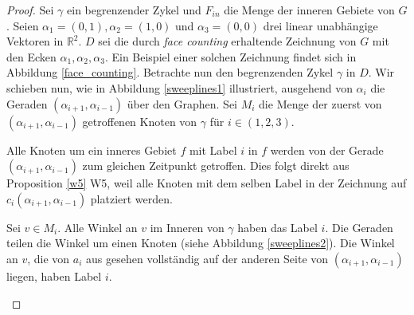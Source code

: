 \begin{proof}
Sei $\gamma$ ein begrenzender Zykel und $F_{in}$ die Menge der inneren Gebiete von $G$. Seien $\alpha_1=(0,1),\alpha_2=(1,0)$ und $\alpha_3=(0,0)$ drei linear unabhängige Vektoren in $\mathbb{R}^2$. $D$ sei die durch \textit{face counting} erhaltende Zeichnung von $G$ mit den Ecken $\alpha_1,\alpha_2,\alpha_3$. Ein Beispiel einer solchen Zeichnung findet sich in Abbildung \ref{face_counting}. Betrachte nun den begrenzenden Zykel $\gamma$ in $D$. Wir schieben nun, wie in Abbildung \ref{sweeplines1} illustriert, ausgehend von $\alpha_i$ die Geraden $(\alpha_{i+1},\alpha_{i-1})$ über den Graphen. Sei $M_i$ die Menge der zuerst von $(\alpha_{i+1},\alpha_{i-1})$ getroffenen Knoten von $\gamma$ für $i \in (1,2,3)$.

\begin{observation}\label{obs1}
Alle Knoten um ein inneres Gebiet $f$ mit Label $i$ in $f$ werden von der Gerade $(\alpha_{i+1},\alpha_{i-1})$ zum gleichen Zeitpunkt getroffen. Dies folgt direkt aus Proposition \ref{w5} W5, weil alle Knoten mit dem selben Label in der Zeichnung auf $c_i(\alpha_{i+1},\alpha_{i-1})$ platziert werden.
\end{observation}

\begin{observation}\label{obs2}
Sei $v \in M_i$. Alle Winkel an $v$ im Inneren von $\gamma$ haben das Label $i$. Die Geraden teilen die Winkel um einen Knoten (siehe Abbildung \ref{sweeplines2}). Die Winkel an $v$, die von $a_i$ aus gesehen vollständig auf der anderen Seite von $(\alpha_{i+1},\alpha_{i-1})$ liegen, haben Label $i$.
\end{observation}


\end{proof}

